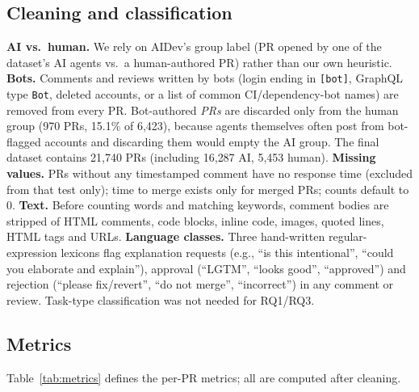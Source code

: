 \documentclass[conference]{IEEEtran}
\begin{document}
\subsection{Cleaning and classification}
\textbf{AI vs.\ human.} We rely on AIDev's group label (PR opened by one of the dataset's AI agents vs.\ a human-authored PR) rather than our own heuristic. \textbf{Bots.} Comments and reviews written by bots (login ending in \texttt{[bot]}, GraphQL type \texttt{Bot}, deleted accounts, or a list of common CI/dependency-bot names) are removed from every PR. Bot-authored \emph{PRs} are discarded only from the human group (970 PRs, 15.1\% of 6{,}423), because agents themselves often post from bot-flagged accounts and discarding them would empty the AI group. The final dataset contains 21{,}740 PRs (including 16{,}287 AI, 5{,}453 human). \textbf{Missing values.} PRs without any timestamped comment have no response time (excluded from that test only); time to merge exists only for merged PRs; counts default to 0. \textbf{Text.} Before counting words and matching keywords, comment bodies are stripped of HTML comments, code blocks, inline code, images, quoted lines, HTML tags and URLs. \textbf{Language classes.} Three hand-written regular-expression lexicons flag explanation requests (e.g., ``is this intentional'', ``could you elaborate and explain''), approval (``LGTM'', ``looks good'', ``approved'') and rejection (``please fix/revert'', ``do not merge'', ``incorrect'') in any comment or review. Task-type classification was not needed for RQ1/RQ3.

\subsection{Metrics}
Table~\ref{tab:metrics} defines the per-PR metrics; all are computed after cleaning.
\end{document}

